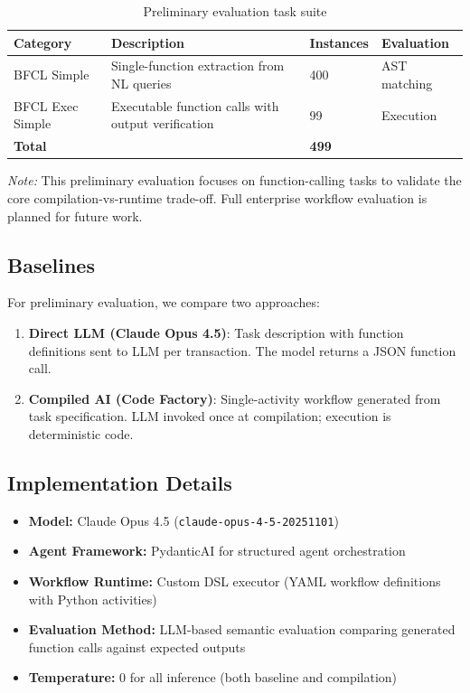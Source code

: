 \documentclass[11pt]{article}
\begin{document}
\begin{table}[ht]
\centering
\caption{Preliminary evaluation task suite}
\label{tab:tasks}
\begin{tabular}{p{3.5cm}p{4cm}p{2cm}p{2.5cm}}
\toprule
Category & Description & Instances & Evaluation \\
\midrule
BFCL Simple & Single-function extraction from NL queries & 400 & AST matching \\
BFCL Exec Simple & Executable function calls with output verification & 99 & Execution \\
\midrule
\textbf{Total} & & \textbf{499} & \\
\bottomrule
\end{tabular}
\end{table}

\noindent\textit{Note:} This preliminary evaluation focuses on function-calling tasks to validate the core compilation-vs-runtime trade-off. Full enterprise workflow evaluation is planned for future work.

\subsection{Baselines}

For preliminary evaluation, we compare two approaches:

\begin{enumerate}
    \item \textbf{Direct LLM (Claude Opus 4.5)}: Task description with function definitions sent to LLM per transaction. The model returns a JSON function call.
    \item \textbf{Compiled AI (Code Factory)}: Single-activity workflow generated from task specification. LLM invoked once at compilation; execution is deterministic code.
\end{enumerate}

\subsection{Implementation Details}

\begin{itemize}
    \item \textbf{Model:} Claude Opus 4.5 (\texttt{claude-opus-4-5-20251101})
    \item \textbf{Agent Framework:} PydanticAI for structured agent orchestration
    \item \textbf{Workflow Runtime:} Custom DSL executor (YAML workflow definitions with Python activities)
    \item \textbf{Evaluation Method:} LLM-based semantic evaluation comparing generated function calls against expected outputs
    \item \textbf{Temperature:} 0 for all inference (both baseline and compilation)
\end{itemize}
\end{document}
